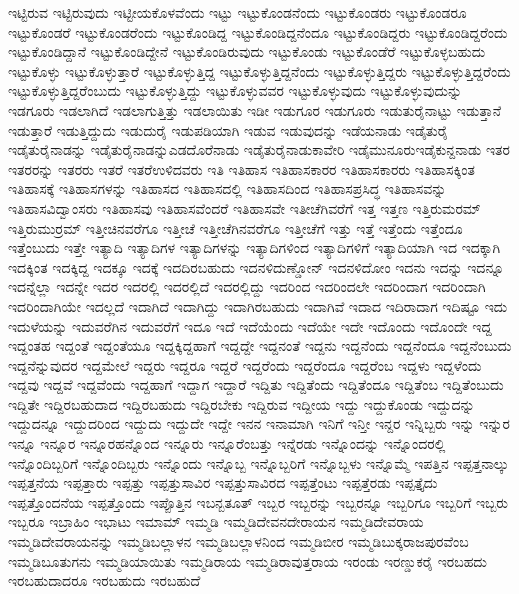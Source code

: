 {ಇಟ್ಟಿರುವ
ಇಟ್ಟಿರುವುದು
ಇಟ್ಟೀಯಕೊಳವೆಂದು
ಇಟ್ಟು
ಇಟ್ಟುಕೊಂಡನೆಂದು
ಇಟ್ಟುಕೊಂಡರು
ಇಟ್ಟುಕೊಂಡರೂ
ಇಟ್ಟುಕೊಂಡರೆ
ಇಟ್ಟುಕೊಂಡರೆಂದು
ಇಟ್ಟುಕೊಂಡಿದ್ದ
ಇಟ್ಟುಕೊಂಡಿದ್ದನೆಂದೂ
ಇಟ್ಟುಕೊಂಡಿದ್ದರು
ಇಟ್ಟುಕೊಂಡಿದ್ದರೆಂದು
ಇಟ್ಟುಕೊಂಡಿದ್ದಾನೆ
ಇಟ್ಟುಕೊಂಡಿದ್ದೇನೆ
ಇಟ್ಟುಕೊಂಡಿರುವುದು
ಇಟ್ಟುಕೊಂಡು
ಇಟ್ಟುಕೊಂಡೆರೆ
ಇಟ್ಟುಕೊಳ್ಳಬಹುದು
ಇಟ್ಟುಕೊಳ್ಳು
ಇಟ್ಟುಕೊಳ್ಳುತ್ತಾರೆ
ಇಟ್ಟುಕೊಳ್ಳುತ್ತಿದ್ದ
ಇಟ್ಟುಕೊಳ್ಳುತ್ತಿದ್ದನೆಂದು
ಇಟ್ಟುಕೊಳ್ಳುತ್ತಿದ್ದರು
ಇಟ್ಟುಕೊಳ್ಳುತ್ತಿದ್ದರೆಂದು
ಇಟ್ಟುಕೊಳ್ಳುತ್ತಿದ್ದರೆಂಬುದು
ಇಟ್ಟುಕೊಳ್ಳುತ್ತಿದ್ದು
ಇಟ್ಟುಕೊಳ್ಳುವವರ
ಇಟ್ಟುಕೊಳ್ಳುವುದು
ಇಟ್ಟುಕೊಳ್ಳುವುದುನ್ನು
ಇಡಗೂರು
ಇಡಲಾಗಿದೆ
ಇಡಲಾಗುತ್ತಿತ್ತು
ಇಡಲಾಯಿತು
ಇಡೀ
ಇಡುಗೂರ
ಇಡುಗೂರು
ಇಡುತುರೈನಾಟ್ಟು
ಇಡುತ್ತಾನೆ
ಇಡುತ್ತಾರೆ
ಇಡುತ್ತಿದ್ದುದು
ಇಡುದುರೈ
ಇಡುಪಡಿಯಾಗಿ
ಇಡುವ
ಇಡುವುದನ್ನು
ಇಡೆಯನಾಡು
ಇಡೈತುರೈ
ಇಡೈತುರೈನಾಡನ್ನು
ಇಡೈತುರೈನಾಡನ್ನುಎಡದೊರೆನಾಡು
ಇಡೈತುರೈನಾಡುಕಾವೇರಿ
ಇಡೈಮುನೂರುಇಡೈಕುನ್ದನಾಡು
ಇತರ
ಇತರರನ್ನು
ಇತರರು
ಇತರೆ
ಇತರೆಉಳಿದವರು
ಇತಿ
ಇತಿಹಾಸ
ಇತಿಹಾಸಕಾರರ
ಇತಿಹಾಸಕಾರರು
ಇತಿಹಾಸಕ್ಕಿಂತ
ಇತಿಹಾಸಕ್ಕೆ
ಇತಿಹಾಸಗಳನ್ನು
ಇತಿಹಾಸದ
ಇತಿಹಾಸದಲ್ಲಿ
ಇತಿಹಾಸದಿಂದ
ಇತಿಹಾಸಪ್ರಸಿದ್ಧ
ಇತಿಹಾಸವನ್ನು
ಇತಿಹಾಸವಿದ್ವಾಂಸರು
ಇತಿಹಾಸವು
ಇತಿಹಾಸವೆಂದರೆ
ಇತಿಹಾಸವೇ
ಇತೀಚೆಗಿವರೆಗೆ
ಇತ್ತ
ಇತ್ತಣ
ಇತ್ತಿರುಮರಮ್
ಇತ್ತಿರುಮುರ್ರಮ್
ಇತ್ತೀಚಿನವರೆಗೂ
ಇತ್ತೀಚೆ
ಇತ್ತೀಚೆಗಿನವರೆಗೂ
ಇತ್ತೀಚೆಗೆ
ಇತ್ತು
ಇತ್ತೆ
ಇತ್ತೆಂದು
ಇತ್ತೆಂದೂ
ಇತ್ತೆಂಬುದು
ಇತ್ತೇ
ಇತ್ಯಾದಿ
ಇತ್ಯಾದಿಗಳ
ಇತ್ಯಾದಿಗಳನ್ನು
ಇತ್ಯಾದಿಗಳಿಂದ
ಇತ್ಯಾದಿಗಳಿಗೆ
ಇತ್ಯಾದಿಯಾಗಿ
ಇದ
ಇದಕ್ಕಾಗಿ
ಇದಕ್ಕಿಂತ
ಇದಕ್ಕಿದ್ದ
ಇದಕ್ಕೂ
ಇದಕ್ಕೆ
ಇದದಿರಬಹುದು
ಇದನಳಿದುಣ್ಡೋನ್
ಇದನಳಿದೋಂ
ಇದನು
ಇದನ್ನು
ಇದನ್ನೂ
ಇದನ್ನೆಲ್ಲಾ
ಇದನ್ನೇ
ಇದರ
ಇದರಲ್ಲಿ
ಇದರಲ್ಲಿದೆ
ಇದರಲ್ಲಿದ್ದು
ಇದರಿಂದ
ಇದರಿಂದಲೇ
ಇದರಿಂದಾಗ
ಇದರಿಂದಾಗಿ
ಇದರಿಂದಾಗಿಯೇ
ಇದಲ್ಲದೆ
ಇದಾಗಿದೆ
ಇದಾಗಿದ್ದು
ಇದಾಗಿರಬಹುದು
ಇದಾಗಿವೆ
ಇದಾದ
ಇದಿರಾದಾಗ
ಇದಿಷ್ಟೂ
ಇದು
ಇದುಳೆಯನ್ನು
ಇದುವರೆಗಿನ
ಇದುವರೆಗೆ
ಇದೂ
ಇದೆ
ಇದೆಯೆಂದು
ಇದೆಯೇ
ಇದೇ
ಇದೊಂದು
ಇದೊಂದೇ
ಇದ್ದ
ಇದ್ದಂತಹ
ಇದ್ದಂತೆ
ಇದ್ದಂತೆಯೂ
ಇದ್ದಕ್ಕಿದ್ದಹಾಗೆ
ಇದ್ದದ್ದೇ
ಇದ್ದನಂತೆ
ಇದ್ದನು
ಇದ್ದನೆಂದು
ಇದ್ದನೆಂದೂ
ಇದ್ದನೆಂಬುದು
ಇದ್ದನೆನ್ನುವುದರ
ಇದ್ದಮೇಲೆ
ಇದ್ದರು
ಇದ್ದರೂ
ಇದ್ದರೆ
ಇದ್ದರೆಂದು
ಇದ್ದರೆಂದೂ
ಇದ್ದರೆಂಬ
ಇದ್ದಳು
ಇದ್ದಳೆಂದು
ಇದ್ದವು
ಇದ್ದವೆ
ಇದ್ದವೆಂದು
ಇದ್ದಹಾಗೆ
ಇದ್ದಾಗ
ಇದ್ದಾರೆ
ಇದ್ದಿತು
ಇದ್ದಿತೆಂದು
ಇದ್ದಿತೆಂದೂ
ಇದ್ದಿತೆಂಬ
ಇದ್ದಿತೆಂಬುದು
ಇದ್ದಿತೇ
ಇದ್ದಿರಬಹುದಾದ
ಇದ್ದಿರಬಹುದು
ಇದ್ದಿರಬೇಕು
ಇದ್ದಿರುವ
ಇದ್ದೀಯ
ಇದ್ದು
ಇದ್ದುಕೊಂಡು
ಇದ್ದುದನ್ನು
ಇದ್ದುದನ್ನೂ
ಇದ್ದುದರಿಂದ
ಇದ್ದುದು
ಇದ್ದುದೇ
ಇದ್ದೇ
ಇನನ
ಇನಾಮಾಗಿ
ಇನಿಗೆ
ಇನ್ತೀ
ಇನ್ದರ
ಇನ್ನಿಬ್ಬರು
ಇನ್ನು
ಇನ್ನುರ
ಇನ್ನೂ
ಇನ್ನೂರ
ಇನ್ನೂರಹನ್ನೊಂದ
ಇನ್ನೂರು
ಇನ್ನೂರೆಂಬತ್ತು
ಇನ್ನೆರಡು
ಇನ್ನೊಂದನ್ನು
ಇನ್ನೊಂದರಲ್ಲಿ
ಇನ್ನೊಂದಿಬ್ಬರಿಗೆ
ಇನ್ನೊಂದಿಬ್ಬರು
ಇನ್ನೊಂದು
ಇನ್ನೊಬ್ಬ
ಇನ್ನೊಬ್ಬರಿಗೆ
ಇನ್ನೊಬ್ಬಳು
ಇನ್ನೊಮ್ಮೆ
ಇಪತ್ತಿನ
ಇಪ್ಪತ್ತನಾಲ್ಕು
ಇಪ್ಪತ್ತನೆಯ
ಇಪ್ಪತ್ತಾರು
ಇಪ್ಪತ್ತು
ಇಪ್ಪತ್ತುಸಾವಿರ
ಇಪ್ಪತ್ತುಸಾವಿರದ
ಇಪ್ಪತ್ತೆಂಟು
ಇಪ್ಪತ್ತೆರಡು
ಇಪ್ಪತ್ತೈದು
ಇಪ್ಪತ್ತೊಂದನೆಯ
ಇಪ್ಪತ್ತೊಂದು
ಇಪ್ಪೊತ್ತಿನ
ಇಬನ್ಬತೂತ್
ಇಬ್ಬರ
ಇಬ್ಬರನ್ನು
ಇಬ್ಬರನ್ನೂ
ಇಬ್ಬರಿಗೂ
ಇಬ್ಬರಿಗೆ
ಇಬ್ಬರು
ಇಬ್ಬರೂ
ಇಬ್ರಾಹಿಂ
ಇಭಾಟು
ಇಮಾಮ್
ಇಮ್ಮಡಿ
ಇಮ್ಮಡಿದೇವನದೇರಾಯನ
ಇಮ್ಮಡಿದೇವರಾಯ
ಇಮ್ಮಡಿದೇವರಾಯನನ್ನು
ಇಮ್ಮಡಿಬಲ್ಲಾಳನ
ಇಮ್ಮಡಿಬಲ್ಲಾಳನಿಂದ
ಇಮ್ಮಡಿಬೀರ
ಇಮ್ಮಡಿಬುಕ್ಕರಾಜಪುರವೆಂಬ
ಇಮ್ಮಡಿಬೂತುಗನು
ಇಮ್ಮಡಿಯಾಯಿತು
ಇಮ್ಮಡಿರಾಯ
ಇಮ್ಮಡಿರಾವುತ್ತರಾಯ
ಇರಂಡು
ಇರಣ್ಡುಕರೈ
ಇರಬಹದು
ಇರಬಹುದಾದರೂ
ಇರಬಹುದು
ಇರಬಹುದೆ
}
